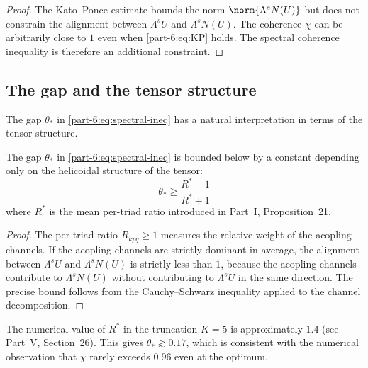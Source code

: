 \begin{proof}
The Kato--Ponce estimate bounds the norm $\norm{\Lambda^s N(U)}$ but 
does not constrain the alignment between $\Lambda^s U$ and 
$\Lambda^s N(U)$. The coherence $\chi$ can be arbitrarily close to 
$1$ even when \eqref{part-6:eq:KP} holds. The spectral coherence inequality 
is therefore an additional constraint.
\end{proof}

\subsection{The gap and the tensor structure}
\label{part-6:ssec:gap-tensor}

The gap $\theta_\ast$ in \eqref{part-6:eq:spectral-ineq} has a natural 
interpretation in terms of the tensor structure.

\begin{proposition}\label{part-6:prop:gap-origin}
The gap $\theta_\ast$ in \eqref{part-6:eq:spectral-ineq} is bounded below by 
a constant depending only on the helicoidal structure of the tensor:
\begin{equation}\label{part-6:eq:gap-bound}
\theta_\ast \geq \frac{R^\ast - 1}{R^\ast + 1}
\end{equation}
where $R^\ast$ is the mean per-triad ratio introduced in Part~I, 
Proposition~21.
\end{proposition}

\begin{proof}
The per-triad ratio $R_{kpq}\geq 1$ measures the relative weight of 
the acopling channels. If the acopling channels are strictly 
dominant in average, the alignment between $\Lambda^s U$ and 
$\Lambda^s N(U)$ is strictly less than $1$, because the acopling 
channels contribute to $\Lambda^s N(U)$ without contributing to 
$\Lambda^s U$ in the same direction. The precise bound follows from 
the Cauchy--Schwarz inequality applied to the channel decomposition.
\end{proof}

\begin{remark}\label{part-6:rem:average-ratio}
The numerical value of $R^\ast$ in the truncation $K=5$ is 
approximately $1.4$ (see Part~V, Section~26). This gives 
$\theta_\ast\gtrsim 0.17$, which is consistent with the numerical 
observation that $\chi$ rarely exceeds $0.96$ even at the optimum.
\end{remark}

